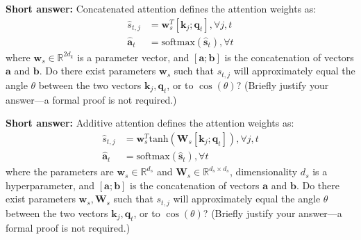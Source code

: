 \documentclass[11pt,addpoints,answers]{exam}
\newcommand{\Rb}{\mathbb{R}}
\newcommand{\av}{\mathbf{a}}
\newcommand{\bv}{\mathbf{b}}
\newcommand{\kv}{\mathbf{k}}
\newcommand{\qv}{\mathbf{q}}
\newcommand{\sv}{\mathbf{s}}
\newcommand{\wv}{\mathbf{w}}
\newcommand{\Wv}{\mathbf{W}}
\begin{document}
\begin{questions}
\begin{parts}
\begin{subparts}
    \begin{answer_box}[title=,height=4cm,width=15cm]
    \end{answer_box}

    \subpart[2] \textbf{Short answer:} Concatenated attention defines the attention weights as:
    \begin{align*}
        \hat{s}_{t,j} &= \wv_s^T [ \kv_j ; \qv_t ], \forall j,t\\
        \hat{\av}_t &= \text{softmax}(\hat{\sv}_t), \forall t
    \end{align*}
    where $\wv_s \in \Rb^{2d_k}$ is a parameter vector, and $[\av; \bv]$ is the concatenation of vectors $\av$ and $\bv$.
    Do there exist parameters $\wv_s$ such that $s_{t,j}$ will approximately equal the angle $\theta$ between the two vectors $\kv_j,\qv_t$, or to $\cos(\theta)$? (Briefly justify your answer---a formal proof is not required.)

    \begin{answer_box}[title=,height=4cm,width=15cm]
    \end{answer_box}

\clearpage

    \subpart[2] \textbf{Short answer:} Additive attention defines the attention weights as:
    \begin{align*}
        \hat{s}_{t,j} &= \wv_s^T \text{tanh}(\Wv_s [ \kv_j ; \qv_t ]), \forall j,t\\
        \hat{\av}_t &= \text{softmax}(\hat{\sv}_t), \forall t
    \end{align*}
    where the parameters are $\wv_s \in \Rb^{d_s}$ and $\Wv_s \in \Rb^{d_s \times d_s}$, dimensionality $d_s$ is a hyperparameter, and $[\av; \bv]$ is the concatenation of vectors $\av$ and $\bv$.
    Do there exist parameters $\wv_s, \Wv_s$ such that $s_{t,j}$ will approximately equal the angle $\theta$ between the two vectors $\kv_j,\qv_t$, or to $\cos(\theta)$? (Briefly justify your answer---a formal proof is not required.)

    \begin{answer_box}[title=,height=4cm,width=15cm]
    \end{answer_box}

\end{subparts}



\end{parts}
\end{questions}
\end{document}
